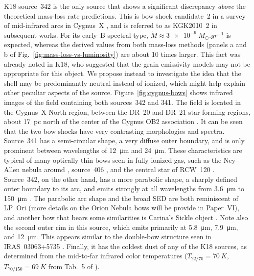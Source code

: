 K18 source~342 is the only source that shows a significant discrepancy
\textit{above} the theoretical mass-loss rate predictions.  This is
bow shock candidate~2 in a survey of mid-infrared arcs in Cygnus~X
\citep{Kobulnicky:2010a}, and is referred to as KGK2010~2 in
subsequent works.  For its early~B spectral type,
\(\dot{M} \approx \SI{3e-9}{M_\odot.yr^{-1}}\) is expected, whereas
the derived values from both mass-loss methods (panels a and b of
Fig.~\ref{fig:mass-loss-vs-luminosity}) are about 10 times larger.
This fact was already noted in K18, who suggested that the grain
emissivity models may not be appropriate for this object.  We propose
instead to investigate the idea that the shell may be predominantly
neutral instead of ionized, which might help explain other peculiar
aspects of the source.  Figure~\ref{fig:cygnus-bows} shows infrared
images of the field containing both sources~342 and 341.  The field is
located in the Cygnus~X North region, between the DR~20 and DR~21 star
forming regions, about \SI{17}{pc} north of the center of the Cygnus
OB2 association \citep[e.g.,][]{Schneider:2016a}.  It can be seen that
the two bow shocks have very contrasting morphologies and spectra.
Source~341 has a semi-circular shape, a very diffuse outer boundary,
and is only prominent between wavelengths of \SI{12}{\um} and
\SI{24}{\um}.  These characteristics are typical of many optically
thin bows seen in fully ionized gas, such as the Ney--Allen nebula
around \thD{} \citetext{compare the bow shape in Fig.~3a of
  \citealp{Smith:2005a}}, source~406 \citetext{HD~92607, which is
  ERO~36 in Carina, \citealp{Sexton:2015b}}, and the central star of
RCW~120 \citetext{not included in current samples, but see
  \citealp{Mackey:2015a, Mackey:2016a}}.  Source~342, on the other
hand, has a more parabolic shape, a sharply defined outer boundary to
its arc, and emits strongly at all wavelengths from \SI{3.6}{\um} to
\SI{150}{\um} \citetext{see also Fig.~13 of
  \citealp{Kobulnicky:2010a}}.  The parabolic arc shape and the broad
SED are both reminiscent of LP~Ori (more details on the Orion Nebula
bows will be provide in Paper~VI), and another bow that bears some
similarities is Carina's Sickle object \citetext{ERO~21
  \citealp{Sexton:2015b}, see also \citealp{Ngoumou:2013a} and \S~4 of
  \citealp{Hartigan:2015a}}.  Note also the second outer rim in this
source, which emits primarily at \SI{5.8}{\um}, \SI{7.9}{\um}, and
\SI{12}{\um}. This appears similar to the double-bow structure seen in
IRAS~03063+5735 \citep{Kobulnicky:2012a}.  Finally, it has the coldest
dust of any of the K18 sources, as determined from the mid-to-far
infrared color temperatures (\(T_{22/70} = \SI{70}{K}\),
\(T_{70/150} = \SI{69}{K}\) from Tab.~5 of
\citealp{Kobulnicky:2017a}).



